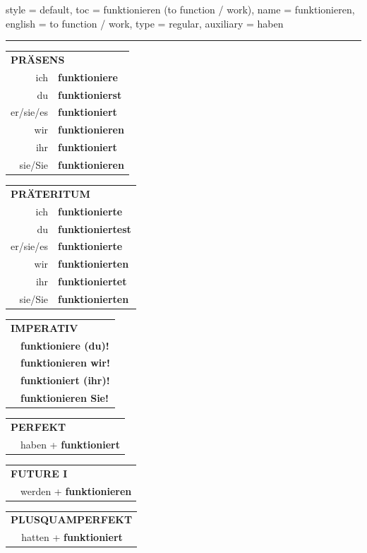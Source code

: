 \begin{verbentry}{
  style = {default},
  toc = {funktionieren (to function / work)},
  name = {funktionieren},
  english = {to function / work},
  type = {regular},
  auxiliary = {haben}
}


\vspace{5pt}
\hrule
\vspace{5pt}

\begin{tabular}{rl}
\multicolumn{2}{l}{\textbf{PRÄSENS}}\\
ich & \textbf{funktioniere}\\
du & \textbf{funktionierst}\\
er/sie/es & \textbf{funktioniert}\\
wir & \textbf{funktionieren}\\
ihr & \textbf{funktioniert}\\
sie/Sie & \textbf{funktionieren}\\
\end{tabular}
\hfill
\begin{tabular}{rl}
\multicolumn{2}{l}{\textbf{PRÄTERITUM}}\\
ich & \textbf{funktionierte}\\
du & \textbf{funktioniertest}\\
er/sie/es & \textbf{funktionierte}\\
wir & \textbf{funktionierten}\\
ihr & \textbf{funktioniertet}\\
sie/Sie & \textbf{funktionierten}\\
\end{tabular}
\hfill
\begin{tabular}{rl}
\multicolumn{2}{l}{\textbf{IMPERATIV}}\\
& \textbf{funktioniere (du)!}\\
& \textbf{funktionieren wir!}\\
& \textbf{funktioniert (ihr)!}\\
& \textbf{funktionieren Sie!}\\
\end{tabular}

\vspace{10pt}

\begin{tabular}{rl}
\multicolumn{2}{l}{\textbf{PERFEKT}}\\
& haben + \textbf{funktioniert}\\
\end{tabular}
\hfill
\begin{tabular}{rl}
\multicolumn{2}{l}{\textbf{FUTURE I}}\\
& werden + \textbf{funktionieren}\\
\end{tabular}
\hfill
\begin{tabular}{rl}
\multicolumn{2}{l}{\textbf{PLUSQUAMPERFEKT}}\\
& hatten + \textbf{funktioniert}\\
\end{tabular}


\end{verbentry}
